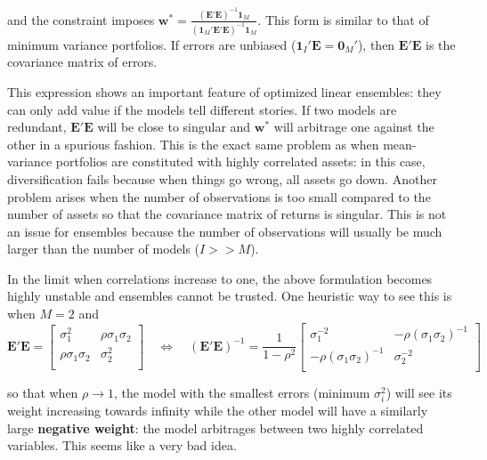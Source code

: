 and the constraint imposes $\textbf{w}^*=\frac{(\textbf{E}'\textbf{E})^{ -1}\textbf{1}_M}{(\textbf{1}_M'\textbf{E}'\textbf{E})^{ -1}\textbf{1}_M}$. This form is similar to that of minimum variance portfolios.  If errors are unbiased ($\textbf{1}_I'\textbf{E}=\textbf{0}_M'$), then $\textbf{E}'\textbf{E}$ is the covariance matrix of errors.

This expression shows an important feature of optimized linear ensembles: they can only add value if the models tell different stories. If two models are redundant, $\textbf{E}'\textbf{E}$ will be close to singular and $\textbf{w}^*$ will arbitrage one against the other in a spurious fashion. This is the exact same problem as when mean-variance portfolios are constituted with highly correlated assets: in this case, diversification fails because when things go wrong, all assets go down. Another problem arises when the number of observations is too small compared to the number of assets so that the covariance matrix of returns is singular. This is not an issue for ensembles because the number of observations will usually be much larger than the number of models ($I>>M$).

In the limit when correlations increase to one, the above formulation becomes highly unstable and ensembles cannot be trusted. One heuristic way to see this is when $M=2$ and
\begin{equation}
\textbf{E}'\textbf{E}=\left[
\begin{array}{cc} \sigma_1^2 & \rho\sigma_1\sigma_2 \\
\rho\sigma_1\sigma_2 & \sigma_2^2 \\
\end{array}
\right] \quad \Leftrightarrow  \quad 
(\textbf{E}'\textbf{E})^{-1}=\frac{1}{1-\rho^2}\left[
\begin{array}{cc} \sigma_1^{-2} & -\rho(\sigma_1\sigma_2)^{-1} \\
-\rho(\sigma_1\sigma_2)^{-1} & \sigma_2^{-2} \\
\end{array}
\right]
\end{equation}

so that when $\rho \rightarrow 1$, the model with the smallest errors (minimum $\sigma_i^2$) will see its weight increasing towards infinity while the other model will have a similarly large \textbf{negative weight}: the model arbitrages between two highly correlated variables. This seems like a very bad idea.

